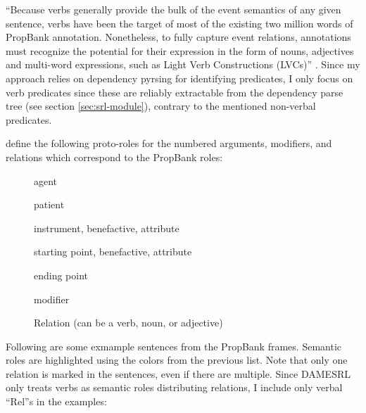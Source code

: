 ``Because verbs generally provide the bulk of the event semantics of any given sentence,
verbs have been the target of most of the existing two million words of PropBank annotation.
Nonetheless, to fully capture event relations, annotations must recognize the potential for
their expression in the form of nouns, adjectives and multi-word expressions, such as Light
Verb Constructions (LVCs)'' \citep[p.~3014]{bonial2014propbank}. Since my approach relies on
dependency pyrsing for identifying predicates, I only focus on verb predicates since these
are reliably extractable from the dependency parse tree (see section \ref{sec:srl-module}),
contrary to the mentioned non-verbal predicates.


\cite{bonial2012english} define the following proto-roles for the numbered arguments, modifiers,
and relations which correspond to the PropBank roles:

\begin{description}
  \item[] agent
  \item[] patient
  \item[] instrument, benefactive, attribute
  \item[] starting point, benefactive, attribute
  \item[] ending point
  \item[] modifier
  \item[] Relation (can be a verb, noun, or adjective)
\end{description}

Following are some exmample sentences from the PropBank frames. Semantic roles are
highlighted using the colors from the previous list. Note that only one relation is marked in the
sentences, even if there are multiple. Since DAMESRL only treats verbs as semantic roles distributing
relations, I include only verbal ``Rel''s in the examples:


